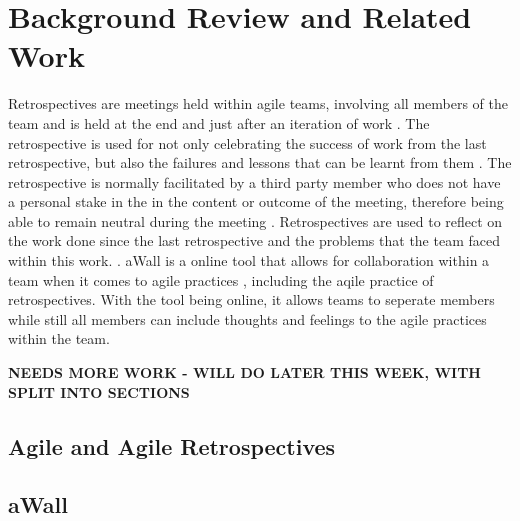 \chapter{Background Review and Related Work}\label{C:background}
Retrospectives are meetings held within agile teams, involving all members of the team and is held at the end and just after an iteration of work \cite{AgileRetrospectivesEstherDerby,GettingValueFromRetrospectives}. The retrospective is used for not only celebrating the success of work from the last retrospective, but also the failures and lessons that can be learnt from them \cite {normanKeith}. The retrospective is normally facilitated by a third party member who does not have a personal stake in the in the content or outcome of the meeting, therefore being able to remain neutral during the meeting \cite{normanKeith,retrospectiveFacilator}. Retrospectives are used to reflect on the work done since the last retrospective and the problems that the team faced within this work. \cite{AgileRetrospectivesEstherDerby}. aWall is a online tool that allows for collaboration within a team when it comes to agile practices \cite{xp2017_aWall}, including the aqile practice of retrospectives. With the tool being online, it allows teams to seperate members while still all members can include thoughts and feelings to the agile practices within the team.  

\textbf{NEEDS MORE WORK - WILL DO LATER THIS WEEK, WITH SPLIT INTO SECTIONS}
\section{Agile and Agile Retrospectives}
\section{aWall}